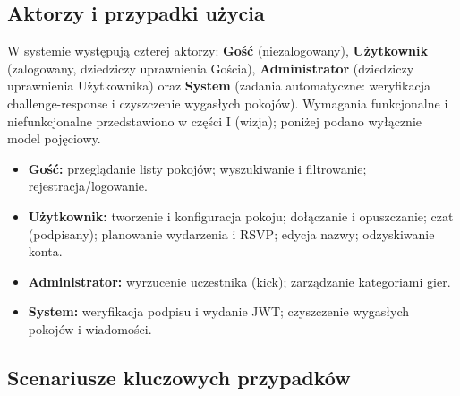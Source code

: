 \subsection{Aktorzy i przypadki użycia}

W systemie występują czterej aktorzy: \textbf{Gość} (niezalogowany), \textbf{Użytkownik}
(zalogowany, dziedziczy uprawnienia Gościa), \textbf{Administrator} (dziedziczy
uprawnienia Użytkownika) oraz \textbf{System} (zadania automatyczne: weryfikacja
challenge-response i czyszczenie wygasłych pokojów). Wymagania funkcjonalne i
niefunkcjonalne przedstawiono w części I (wizja); poniżej podano wyłącznie model
pojęciowy.

\begin{itemize}
  \item \textbf{Gość:} przeglądanie listy pokojów; wyszukiwanie i filtrowanie;
        rejestracja/logowanie.
  \item \textbf{Użytkownik:} tworzenie i konfiguracja pokoju; dołączanie i opuszczanie;
        czat (podpisany); planowanie wydarzenia i RSVP; edycja nazwy; odzyskiwanie konta.
  \item \textbf{Administrator:} wyrzucenie uczestnika (kick); zarządzanie kategoriami gier.
  \item \textbf{System:} weryfikacja podpisu i wydanie JWT; czyszczenie wygasłych pokojów
        i wiadomości.
\end{itemize}


\subsection{Scenariusze kluczowych przypadków}


